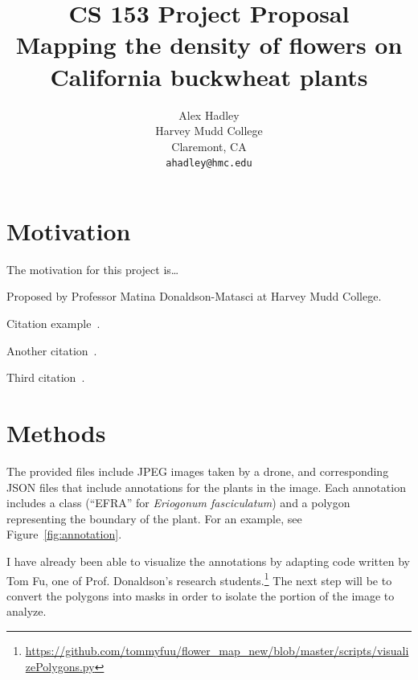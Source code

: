 \documentclass[10pt,twocolumn,letterpaper]{article}
\begin{document}
\title{CS 153 Project Proposal\\
Mapping the density of flowers on California buckwheat plants
}

\author{Alex Hadley\\
Harvey Mudd College\\
Claremont, CA\\
{\tt\small ahadley@hmc.edu}
}
\maketitle


\section{Motivation}

The motivation for this project is\dots

Proposed by Professor Matina Donaldson-Matasci at Harvey Mudd College.

Citation example~\cite{Potts}.

Another citation~\cite{Donaldson}.

Third citation~\cite{Donkersley}.

\section{Methods}

The provided files include JPEG images taken by a drone, and corresponding JSON files that include annotations for the plants in the image. Each annotation includes a class (``EFRA'' for \textit{Eriogonum fasciculatum}) and a polygon representing the boundary of the plant. For an example, see Figure~\ref{fig:annotation}.

I have already been able to visualize the annotations by adapting code written by Tom Fu, one of Prof. Donaldson's research students.\footnote{\url{https://github.com/tommyfuu/flower_map_new/blob/master/scripts/visualizePolygons.py}} The next step will be to convert the polygons into masks in order to isolate the portion of the image to analyze.
\end{document}
